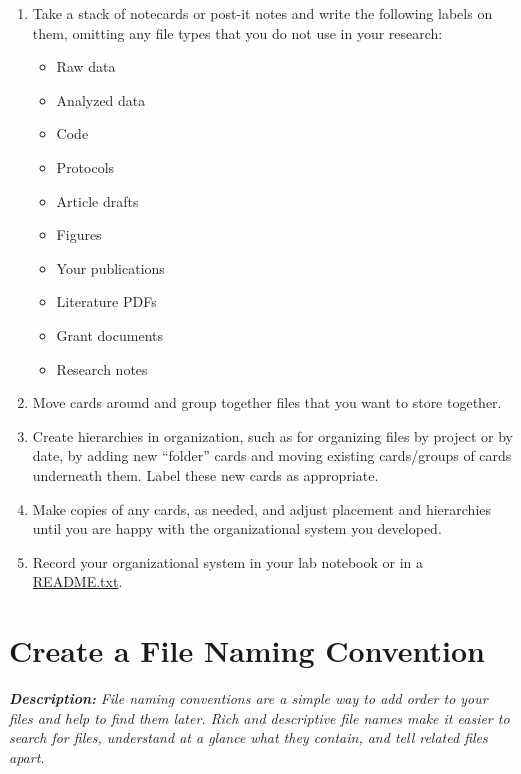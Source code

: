 \documentclass[
]{book}
\providecommand{\tightlist}{%
  \setlength{\itemsep}{0pt}\setlength{\parskip}{0pt}}
\begin{document}
\begin{enumerate}
\def\labelenumi{\arabic{enumi}.}
\tightlist
\item
  Take a stack of notecards or post-it notes and write the following labels on them, omitting any file types that you do not use in your research:

  \begin{itemize}
  \tightlist
  \item
    Raw data
  \item
    Analyzed data
  \item
    Code
  \item
    Protocols
  \item
    Article drafts
  \item
    Figures
  \item
    Your publications
  \item
    Literature PDFs
  \item
    Grant documents
  \item
    Research notes
  \end{itemize}
\item
  Move cards around and group together files that you want to store together.
\item
  Create hierarchies in organization, such as for organizing files by project or by date, by adding new ``folder'' cards and moving existing cards/groups of cards underneath them. Label these new cards as appropriate.
\item
  Make copies of any cards, as needed, and adjust placement and hierarchies until you are happy with the organizational system you developed.
\item
  Record your organizational system in your lab notebook or in a \protect\hyperlink{readme-txt}{README.txt}.
\end{enumerate}

\hypertarget{file-naming}{%
\section{Create a File Naming Convention}\label{file-naming}}

\textbf{\emph{Description:}} \emph{File naming conventions are a simple way to add order to your files and help to find them later. Rich and descriptive file names make it easier to search for files, understand at a glance what they contain, and tell related files apart.}
\end{document}
